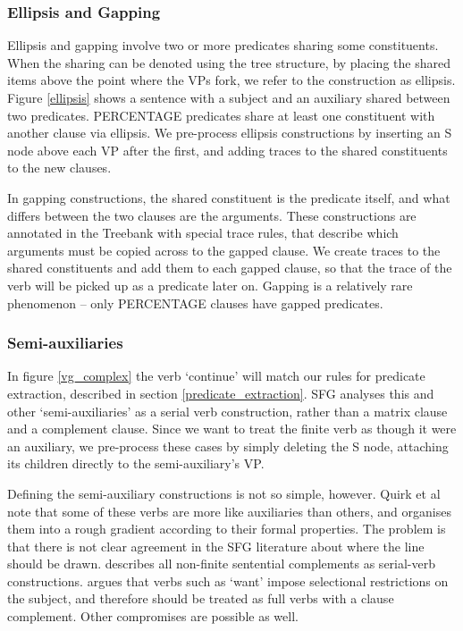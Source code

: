 \documentclass[11pt]{article}
\begin{document}
\subsubsection{Ellipsis and Gapping}

Ellipsis and gapping involve two or more predicates sharing some constituents. When the sharing can be denoted using the tree structure, by placing the shared items above the point where the VPs fork, we refer to the construction as ellipsis. Figure \ref{ellipsis} shows a sentence with a subject and an auxiliary shared between two predicates. PERCENTAGE predicates share at least one constituent with another clause via ellipsis. We pre-process ellipsis constructions by inserting an S node above each VP after the first, and adding traces to the shared constituents to the new clauses.

In gapping constructions, the shared constituent is the predicate itself, and what differs between the two clauses are the arguments. These constructions are annotated in the Treebank with special trace rules, that describe which arguments must be copied across to the gapped clause. We create traces to the shared constituents and add them to each gapped clause, so that the trace of the verb will be picked up as a predicate later on. Gapping is a relatively rare phenomenon -- only PERCENTAGE clauses have gapped predicates.

\subsubsection{Semi-auxiliaries}

In figure \ref{vg_complex} the verb `continue' will match our rules for predicate extraction, described in section \ref{predicate_extraction}. SFG analyses this and other `semi-auxiliaries' \citep{quirk} as a serial verb construction, rather than a matrix clause and a complement clause. Since we want to treat the finite verb as though it were an auxiliary, we pre-process these cases by simply deleting the S node, attaching its children directly to the semi-auxiliary's VP.

Defining the semi-auxiliary constructions is not so simple, however. Quirk et al note that some of these verbs are more like auxiliaries than others, and organises them into a rough gradient according to their formal properties. The problem is that there is not clear agreement in the SFG literature about where the line should be drawn. \citet{lexcart} describes all non-finite sentential complements as serial-verb constructions. \citet{martin} argues that verbs such as `want' impose selectional restrictions on the subject, and therefore should be treated as full verbs with a clause complement. Other compromises are possible as well.
\end{document}
